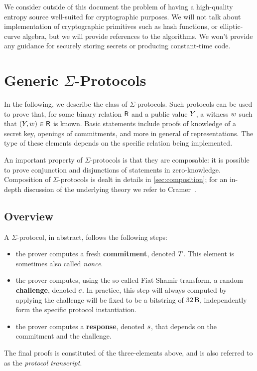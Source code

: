 \documentclass[11pt]{article}
\begin{document}
We consider outside of this document the problem of having a high-quality
entropy source well-suited for crypto\-graphic purposes.
We will not talk about implementation of cryptographic primitives such as hash functions, or elliptic-curve algebra, but we will provide references to the algorithms.
We won't provide any guidance for securely storing secrets or producing constant-time code.

\section{Generic $\Sigma$-Protocols}
In the following, we describe the class of $\Sigma$-protocols.
Such protocols can be used to prove that, for some binary relation $\mathsf{R}$ and a public value $Y$, a witness $w$ such that $(Y,w)\in\mathsf{R}$ is known.
Basic statements include proofs of knowledge of a secret key, openings of commitments, and more in general of representations.
The type of these elements depends on the specific relation being implemented.

An important property of $\Sigma$-protocols is that they are composable: it is possible to prove conjunction and disjunctions of statements in zero-knowledge.
Composition of $\Sigma$-protocols is dealt in details in \cref{sec:composition}; for an in-depth discussion of the underlying theory we refer to Cramer~\cite{cramer97}.

\subsection{Overview}
A $\Sigma$-protocol, in abstract, follows the following steps:
\begin{itemize}
  \item the prover computes a fresh \textbf{commitment}, denoted $T$. This element is sometimes also called \emph{nonce}.
  \item the prover computes, using the so-called Fiat-Shamir transform, a random \textbf{challenge}, denoted $c$. In practice, this step will always computed by applying the challenge will be fixed to be a bitstring of $\seedlen$, independently form the specific protocol instantiation.
  \item the prover computes a \textbf{response}, denoted $s$, that depends on the commitment and the challenge.
\end{itemize}
The final proofs is constituted of the three-elements above, and is also referred to as the \emph{protocol transcript}.
\end{document}
